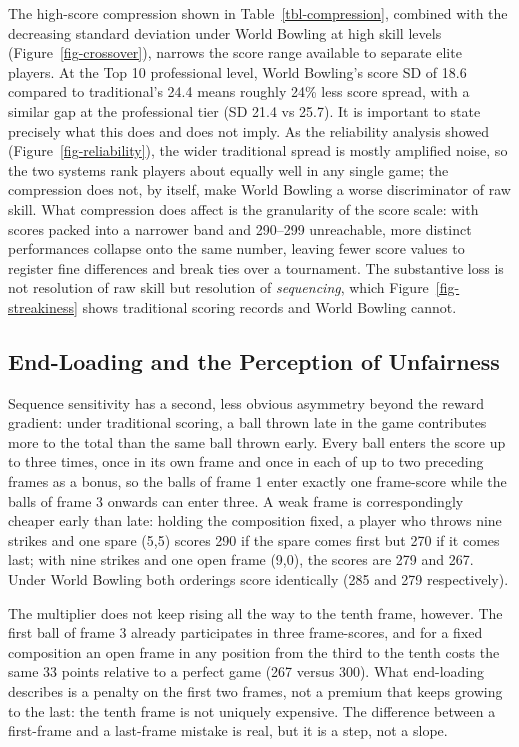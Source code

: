 \documentclass[
  letterpaper,
  DIV=11,
  numbers=noendperiod]{scrartcl}
\begin{document}
The high-score compression shown in Table~\ref{tbl-compression},
combined with the decreasing standard deviation under World Bowling at
high skill levels (Figure~\ref{fig-crossover}), narrows the score range
available to separate elite players. At the Top 10 professional level,
World Bowling's score SD of 18.6 compared to traditional's 24.4 means
roughly 24\% less score spread, with a similar gap at the professional
tier (SD 21.4 vs 25.7). It is important to state precisely what this
does and does not imply. As the reliability analysis showed
(Figure~\ref{fig-reliability}), the wider traditional spread is mostly
amplified noise, so the two systems rank players about equally well in
any single game; the compression does not, by itself, make World Bowling
a worse discriminator of raw skill. What compression does affect is the
granularity of the score scale: with scores packed into a narrower band
and 290--299 unreachable, more distinct performances collapse onto the
same number, leaving fewer score values to register fine differences and
break ties over a tournament. The substantive loss is not resolution of
raw skill but resolution of \emph{sequencing}, which
Figure~\ref{fig-streakiness} shows traditional scoring records and World
Bowling cannot.

\subsection{End-Loading and the Perception of
Unfairness}\label{end-loading-and-the-perception-of-unfairness}

Sequence sensitivity has a second, less obvious asymmetry beyond the
reward gradient: under traditional scoring, a ball thrown late in the
game contributes more to the total than the same ball thrown early.
Every ball enters the score up to three times, once in its own frame and
once in each of up to two preceding frames as a bonus, so the balls of
frame 1 enter exactly one frame-score while the balls of frame 3 onwards
can enter three. A weak frame is correspondingly cheaper early than
late: holding the composition fixed, a player who throws nine strikes
and one spare (5,5) scores 290 if the spare comes first but 270 if it
comes last; with nine strikes and one open frame (9,0), the scores are
279 and 267. Under World Bowling both orderings score identically (285
and 279 respectively).

The multiplier does not keep rising all the way to the tenth frame,
however. The first ball of frame 3 already participates in three
frame-scores, and for a fixed composition an open frame in any position
from the third to the tenth costs the same 33 points relative to a
perfect game (267 versus 300). What end-loading describes is a penalty
on the first two frames, not a premium that keeps growing to the last:
the tenth frame is not uniquely expensive. The difference between a
first-frame and a last-frame mistake is real, but it is a step, not a
slope.
\end{document}

